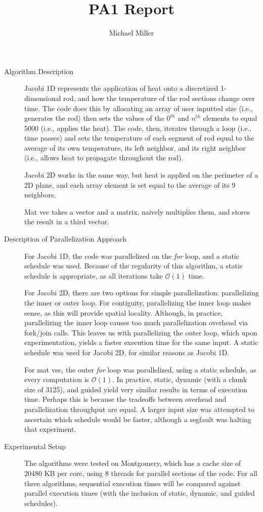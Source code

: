 \documentclass{article}
\author{Michael Miller}
\title{PA1 Report}
\begin{document}
\begin{description}

\item[Algorithm Description] Jacobi 1D represents the application of heat onto a discretized 1-dimensional rod, and how the temperature of the rod sections change over time. The code does this by allocating an array of user inputted size (i.e., generates the rod) then sets the values of the $0^{th}$ and $n^{th}$ elements to equal 5000 (i.e., applies the heat). The code, then, iterates through a loop (i.e., time passes) and sets the temperature of each segment of rod equal to the average of its own temperature, its left neighbor, and its right neighbor (i.e., allows heat to propagate throughout the rod).

Jacobi 2D works in the same way, but heat is applied on the perimeter of a 2D plane, and each array element is set equal to the average of its 9 neighbors.

Mat vec takes a vector and a matrix, naively multiplies them, and stores the result in a third vector.

\item[Description of Parallelization Approach] For Jacobi 1D, the code was parallelized on the \emph{for} loop, and a static schedule was used. Because of the regularity of this algorithm, a static schedule is appropriate, as all iterations take $\mathcal{O}(1)$ time. 

For Jacobi 2D, there are two options for simple parallelization: parallelizing the inner or outer loop. For contiguity, parallelizing the inner loop makes sense, as this will provide spatial locality. Although, in practice, parallelizing the inner loop causes too much parallelization overhead via fork/join calls. This leaves us with parallelizing the outer loop, which upon experimentation, yields a faster execution time for the same input. A static schedule was used for Jacobi 2D, for similar reasons as Jacobi 1D.

For mat vec, the outer \emph{for} loop was parallelized, using a static schedule, as every computation is $\mathcal{O}(1)$. In practice, static, dynamic (with a chunk size of 3125), and guided yield very similar results in terms of execution time. Perhaps this is because the tradeoffs between overhead and parallelization throughput are equal. A larger input size was attempted to ascertain which schedule would be faster, although a segfault was halting that experiment.

\item[Experimental Setup] The algorithms were tested on Montgomery, which has a cache size of 20480 KB per core, using 8 threads for parallel sections of the code. For all three algorithms, sequential execution times will be compared against parallel execution times (with the inclusion of static, dynamic, and guided schedules).


\end{description}
\end{document}

